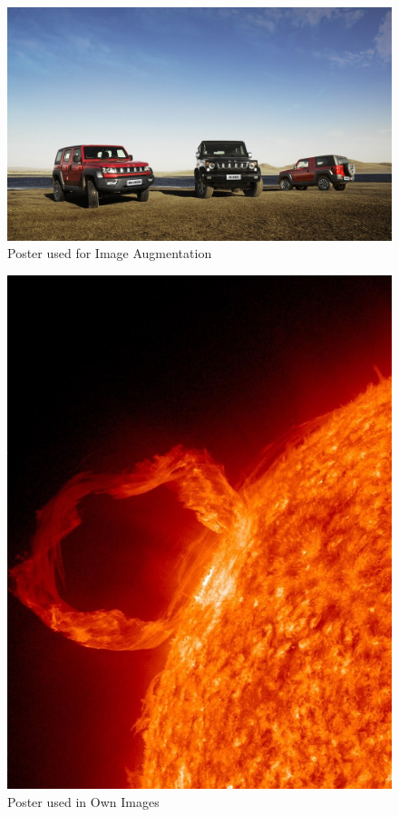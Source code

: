 \documentclass[a4paper,twocolumn]{article}
\begin{document}
\begin{figure}[htbp]
    \centering
    \includegraphics[width=0.9\columnwidth]{img_alt/poster.jpg}
    \caption{Poster used for Image Augmentation\cite{v_speed}}
    \label{fig:img-poster}
\end{figure}

\begin{figure}[htbp]
    \centering
    \includegraphics[width=0.9\columnwidth]{img_alt/solar-flare-978_960_720.jpg}
    \caption{Poster used in Own Images\cite{fireimg}}
    \label{fig:img-poster2}
\end{figure}
\end{document}
